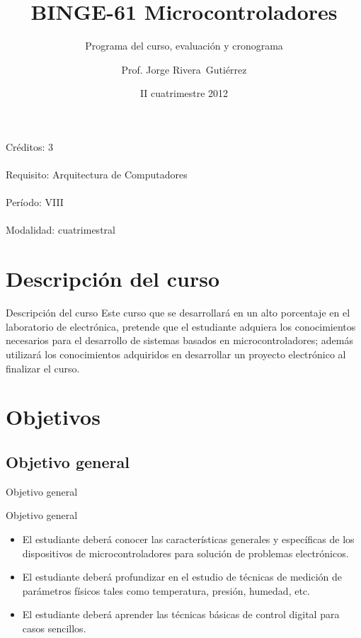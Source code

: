 \documentclass[xcolor=dvipsnames,handout]{beamer}
\title[$\mu C$]{BINGE-61 Microcontroladores}
\subtitle{Programa del curso, evaluación y cronograma}
\author{Prof. Jorge Rivera~Guti\'errez}
\institute{Universidad Latina de Costa Rica\\ Ingenier\'\i a en Electr\'onica}
\date{II cuatrimestre 2012}
\newcommand{\pageframe}[1]{\frame{\begin{center}{ \Huge #1 }\end{center}}}
\begin{document}
\begin{frame}
 \maketitle
\end{frame}

\begin{frame}
 \begin{center}
  \Large Créditos: 3\\~\\
  Requisito: Arquitectura de Computadores\\~\\
  Período: VIII\\~\\
  Modalidad: cuatrimestral
 \end{center}
\end{frame}

\section{Descripción del curso}

\begin{frame}{Descripción del curso}
 Este curso  que se desarrollar\'a en un alto porcentaje en el laboratorio de electr\'onica, pretende que el estudiante adquiera los conocimientos necesarios para el desarrollo de sistemas basados en microcontroladores; adem\'as utilizar\'a los conocimientos adquiridos en desarrollar un proyecto electr\'onico al finalizar el curso.
\end{frame}

\section{Objetivos}

\pageframe{Objetivos}

\subsection{Objetivo general}

\begin{frame}{Objetivo general}
  \begin{block}{Objetivo general}
    \begin{itemize}
      \item El estudiante deberá conocer las características generales y específicas de los dispositivos de microcontroladores para solución de problemas electrónicos.
      \item El estudiante deberá profundizar en el estudio de técnicas de medición de parámetros físicos tales como temperatura, presión, humedad, etc.
      \item El estudiante deberá aprender las técnicas básicas de control digital para casos sencillos.
    \end{itemize}
  \end{block}
\end{frame}
\end{document}
